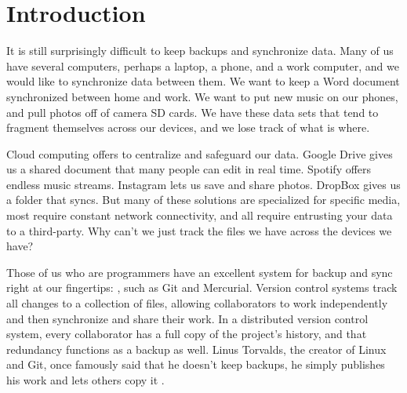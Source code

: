 \chapter{Introduction}


It is still surprisingly difficult to keep backups and synchronize data. Many of
us have several computers, perhaps a laptop, a phone, and a work computer, and
we would like to synchronize data between them. We want to keep a Word document
synchronized between home and work. We want to put new music on our phones, and
pull photos off of camera SD cards. We have these data sets that tend to
fragment themselves across our devices, and we lose track of what is where.

Cloud computing offers to centralize and safeguard our data. Google Drive gives
us a shared document that many people can edit in real time. Spotify offers
endless music streams. Instagram lets us save and share photos. DropBox gives us
a folder that syncs. But many of these solutions are specialized for specific
media, most require constant network connectivity, and all require entrusting
your data to a third-party. Why can't we just track the files we have across the
devices we have?

Those of us who are programmers have an excellent system for backup and sync
right at our fingertips: ,
such as Git and Mercurial. Version control systems track all changes to a
collection of files, allowing collaborators to work independently and then
synchronize and share their work. In a distributed version control system, every
collaborator has a full copy of the project's history, and that redundancy
functions as a backup as well. Linus Torvalds, the creator of Linux and Git,
once famously said that he doesn't keep backups, he simply publishes his work
and lets others copy it \cite{linus_no_backups}.
